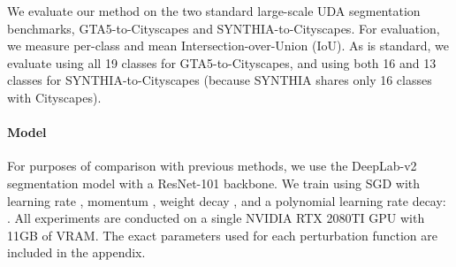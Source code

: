\documentclass[final]{cvpr}
\begin{document}
We evaluate our method on the two standard large-scale UDA segmentation benchmarks, GTA5-to-Cityscapes and SYNTHIA-to-Cityscapes. For evaluation, we measure per-class and mean Intersection-over-Union (IoU). As is standard, we evaluate using all 19 classes for GTA5-to-Cityscapes, and using both 16 and 13 classes for SYNTHIA-to-Cityscapes (because SYNTHIA shares only 16 classes with Cityscapes). 

\paragraph{Model}

For purposes of comparison with previous methods, we use the DeepLab-v2 segmentation model \cite{deeplab} with a ResNet-101 \cite{resnet} backbone. We train using SGD with learning rate , momentum , weight decay , and a polynomial learning rate decay: . All experiments are conducted on a single NVIDIA RTX 2080TI GPU with 11GB of VRAM. The exact parameters used for each perturbation function are included in the appendix. 
\end{document}
